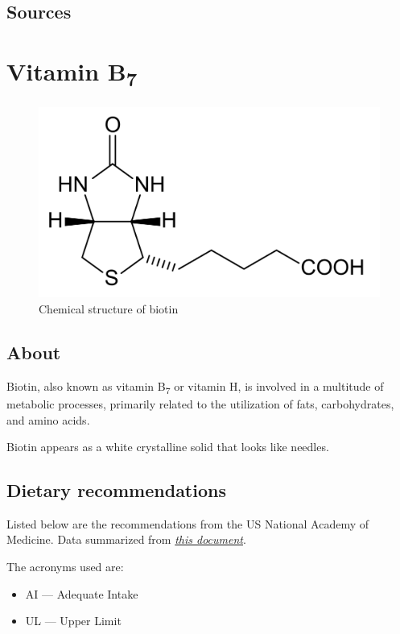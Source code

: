 \documentclass{book}
\begin{document}
\section{Sources}


\chapter{Vitamin B\textsubscript{7}}
\begin{figure}[h]
	\caption{Chemical structure of biotin}
	\centering \includegraphics[width=\textwidth]{images/Vitamin_B7_chemical_structure}
\end{figure}
\newpage

\section{About}
Biotin, also known as vitamin B\textsubscript{7} or vitamin H, is involved in a multitude of metabolic processes, primarily related to the utilization of fats, carbohydrates, and amino acids.

Biotin appears as a white crystalline solid that looks like needles.

\section{Dietary recommendations}
Listed below are the recommendations from the US National Academy of Medicine. Data summarized from \href{https://nap.nationalacademies.org/read/6015/chapter/13}{\textit{this document}}.

The acronyms used are:
\begin{itemize}
	\item AI --- Adequate Intake
	\item UL --- Upper Limit
\end{itemize}
\end{document}
